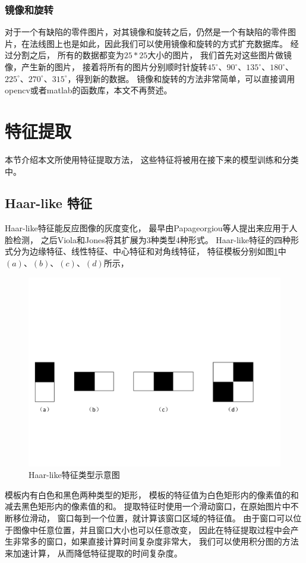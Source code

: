 \subsubsection{镜像和旋转}

对于一个有缺陷的零件图片，对其镜像和旋转之后，仍然是一个有缺陷的零件图片，在法线图上也是如此，因此我们可以使用镜像和旋转的方式扩充数据库。
经过分割之后，
所有的数据都变为$25*25$大小的图片，
我们首先对这些图片做镜像，产生新的图片，
接着将所有的图片分别顺时针旋转$45^\circ$、$90^\circ$、$135^\circ$、$180^\circ$、$225^\circ$、$270^\circ$、$315^\circ$，得到新的数据。
镜像和旋转的方法非常简单，可以直接调用opencv\cite{opencv_library}或者matlab\cite{MATLAB:2017}的函数库，本文不再赘述。

\section{特征提取}
\label{section:tezhengtiqu}

本节介绍本文所使用特征提取方法，
这些特征将被用在接下来的模型训练和分类中。

\subsection{Haar-like 特征}

Haar-like特征能反应图像的灰度变化，
最早由Papageorgiou等人提出来应用于人脸检测，
之后Viola和Jones\cite{viola2001rapid}将其扩展为3种类型4种形式。
Haar-like特征的四种形式分为边缘特征、线性特征、中心特征和对角线特征，
特征模板分别如图\ref{fig:haar-like}中$(a)$、$(b)$、$(c)$、$(d)$所示，
\begin{figure}[htbp]
\centering
\includegraphics[width=1.0\linewidth]{figures/haar-like.pdf}
\caption{Haar-like特征类型示意图}
\label{fig:haar-like}
\end{figure}
模板内有白色和黑色两种类型的矩形，
模板的特征值为白色矩形内的像素值的和减去黑色矩形内的像素值的和。
提取特征时使用一个滑动窗口，在原始图片中不断移位滑动，
窗口每到一个位置，就计算该窗口区域的特征值。
由于窗口可以位于图像中任意位置，并且窗口大小也可以任意改变，
因此在特征提取过程中会产生非常多的窗口，如果直接计算时间复杂度非常大，
我们可以使用积分图的方法来加速计算，
从而降低特征提取的时间复杂度。

